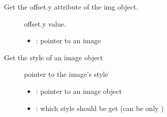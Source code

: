 \documentclass[letterpaper,10pt,english]{sphinxmanual}
\begin{document}

\begin{fulllineitems}
\label{\detokenize{object-types/img:_CPPv419lv_img_get_offset_yP8lv_obj_t}}%
\pysigstartmultiline
{}\label{\detokenize{object-types/img:lv__img_8h_1ae9b985a23a5cb0d07c7ec4cd228e529a}}%
\pysigstopmultiline
Get the offset.y attribute of the img object. \begin{description}
\item[{}] \leavevmode
offset.y value. 

\item[{}] \leavevmode\begin{itemize}
\item {} 
: pointer to an image 

\end{itemize}

\end{description}


\end{fulllineitems}


\begin{fulllineitems}
\label{\detokenize{object-types/img:_CPPv416lv_img_get_stylePK8lv_obj_t14lv_img_style_t}}%
\pysigstartmultiline
{}\label{\detokenize{object-types/img:lv__img_8h_1abfd8631e3632c2b1ae1b05abb04af9a3}}%
\pysigstopmultiline
Get the style of an image object \begin{description}
\item[{}] \leavevmode
pointer to the image’s style 

\item[{}] \leavevmode\begin{itemize}
\item {} 
: pointer to an image object 

\item {} 
: which style should be get (can be only ) 

\end{itemize}

\end{description}


\end{fulllineitems}
\end{document}

